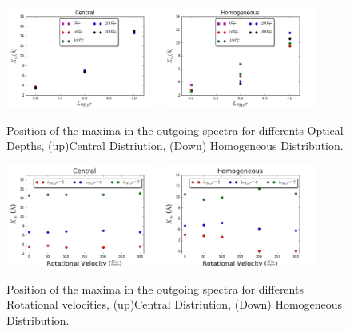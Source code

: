 \documentclass[usenatbib]{mn2e}
\begin{document}
\begin{figure}
    \includegraphics[width=0.45\textwidth]{maximumvsODDifSpeedsCentral.png}
    \includegraphics[width=0.45\textwidth]{maximumvsODDifSpeedsHOM.png}
  \label{figure:maximavsOD}\caption{Position of the maxima in the outgoing spectra for differents Optical Depths, (up)Central Distriution, (Down) Homogeneous Distribution.}
\end{figure}


\begin{figure}
    \includegraphics[width=0.45\textwidth]{maximumvsvelocitiesDifODCentral.png}
    \includegraphics[width=0.45\textwidth]{maximumvsvelocitiesDifODHOM.png}
  \label{figure:maximumsvsvelocities}\caption{Position of the maxima in the outgoing spectra for differents Rotational velocities, (up)Central Distriution, (Down) Homogeneous Distribution.}
\end{figure}
\end{document}

